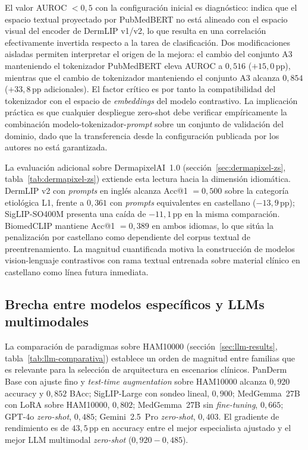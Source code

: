 El valor AUROC $<0{,}5$ con la configuración inicial es
diagnóstico: indica que el espacio textual proyectado por PubMedBERT
no está alineado con el espacio visual del encoder de DermLIP
v1/v2, lo que resulta en una correlación efectivamente invertida
respecto a la tarea de clasificación. Dos modificaciones aisladas
permiten interpretar el origen de la mejora: el cambio del conjunto
A3 manteniendo el tokenizador PubMedBERT eleva AUROC a $0{,}516$
($+15{,}0$\,pp), mientras que el cambio de tokenizador
manteniendo el conjunto A3 alcanza $0{,}854$ ($+33{,}8$\,pp
adicionales). El factor crítico es por tanto la compatibilidad del
tokenizador con el espacio de \emph{embeddings} del modelo
contrastivo. La implicación práctica es que cualquier despliegue
zero-shot debe verificar empíricamente la combinación
modelo-tokenizador-\emph{prompt} sobre un conjunto de validación
del dominio, dado que la transferencia desde la configuración
publicada por los autores no está garantizada.

La evaluación adicional sobre DermapixelAI~1.0
(secci\'on~\ref{sec:dermapixel-zs}, tabla~\ref{tab:dermapixel-zs})
extiende esta lectura hacia la dimensión idiomática. DermLIP v2
con \emph{prompts} en inglés alcanza Acc@1 $= 0{,}500$ sobre la
categoría etiológica L1, frente a $0{,}361$ con \emph{prompts}
equivalentes en castellano ($-13{,}9$\,pp); SigLIP-SO400M
presenta una caída de $-11{,}1$\,pp en la misma comparación.
BiomedCLIP mantiene Acc@1 $= 0{,}389$ en ambos idiomas, lo que
sitúa la penalización por castellano como dependiente del corpus
textual de preentrenamiento. La magnitud cuantificada motiva la
construcción de modelos vision-lenguaje contrastivos con rama
textual entrenada sobre material clínico en castellano como
línea futura inmediata.

\subsection{Brecha entre modelos específicos y LLMs multimodales}
\label{sec:disc-llm}

La comparación de paradigmas sobre HAM10000
(secci\'on~\ref{sec:llm-results}, tabla~\ref{tab:llm-comparativa})
establece un orden de magnitud entre familias que es relevante
para la selección de arquitectura en escenarios clínicos. PanDerm
Base con ajuste fino y \emph{test-time augmentation} sobre
HAM10000 alcanza $0{,}920$ accuracy y $0{,}852$ BAcc; SigLIP-Large con sondeo lineal, $0{,}900$; MedGemma~27B
con LoRA sobre HAM10000, $0{,}802$; MedGemma~27B sin
\emph{fine-tuning}, $0{,}665$; GPT-4o \emph{zero-shot},
$0{,}485$; Gemini~2.5~Pro \emph{zero-shot}, $0{,}403$. El
gradiente de rendimiento es de $43{,}5$\,pp en accuracy entre
el mejor especialista ajustado y el mejor LLM multimodal
\emph{zero-shot} ($0{,}920 - 0{,}485$).

